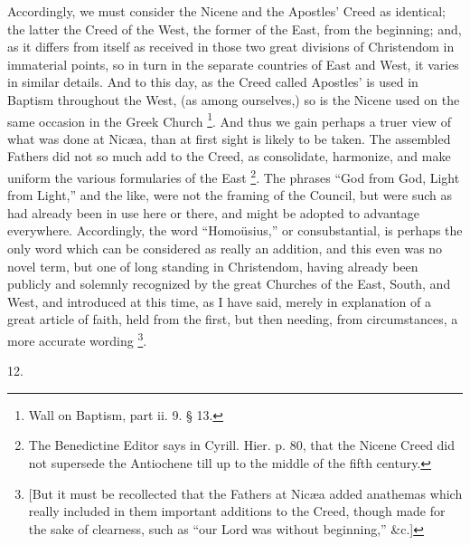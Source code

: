Accordingly, we must consider the Nicene and the Apostles' Creed as
identical; the latter the Creed of the West, the former of the East,
from the beginning; and, as it differs from itself as received in
those two great divisions of Christendom in immaterial points, so in
turn in the separate countries of East and West, it varies in similar
details. And to this day, as the Creed called Apostles' is used in
Baptism throughout the West, (as among ourselves,) so is the Nicene
used on the same occasion in the Greek Church \footnote{Wall on Baptism, part ii. 9. § 13.}. And thus we gain perhaps a truer view of what was done at
Nicæa, than at first sight is likely to be taken. The assembled
Fathers did not so much add to the Creed, as consolidate, harmonize,
and make uniform the various formularies of the East \footnote{The Benedictine Editor says in Cyrill.
Hier. p. 80, that the Nicene Creed did not supersede the Antiochene
till up to the middle of the fifth century.}. The phrases ``God from God, Light from Light,'' and
the like, were not the framing of the Council, but were such as had
already been in use here or there, and might be adopted to
advantage everywhere. Accordingly, the word ``Homoüsius,'' or
consubstantial, is perhaps the only word which can be considered as
really an addition, and this even was no novel term, but one of long
standing in Christendom, having already been publicly and solemnly
recognized by the great Churches of the East, South, and West, and
introduced at this time, as I have said, merely in explanation of a
great article of faith, held from the first, but then needing, from
circumstances, a more accurate wording \footnote{[But it must be recollected that the
Fathers at Nicæa added anathemas which really included in them
important additions to the Creed, though made for the sake of
clearness, such as ``our Lord was without beginning,''
\&c.]}.

12.

